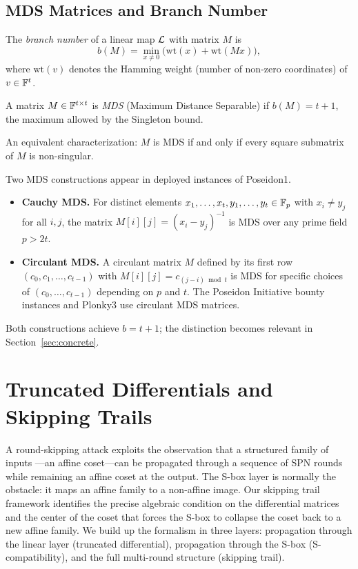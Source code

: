 \documentclass[11pt]{article}
\begin{document}
\subsection{MDS Matrices and Branch Number}
\label{sec:mds}

\begin{definition}
    The \emph{branch number} of a linear map $\mathcal{L}$ with matrix $M$ is
    \[
        b(M) = \min_{x \neq 0}\bigl(\mathrm{wt}(x) + \mathrm{wt}(Mx)\bigr),
    \]
    where $\mathrm{wt}(v)$ denotes the Hamming weight (number of non-zero coordinates) of $v \in \mathbb{F}^t$.
\end{definition}

\begin{definition}
    A matrix $M \in \mathbb{F}^{t \times t}$ is \emph{MDS} (Maximum Distance Separable) if $b(M) = t + 1$, the maximum allowed by the Singleton bound.
\end{definition}

An equivalent characterization: $M$ is MDS if and only if every square submatrix of $M$ is non-singular.

Two MDS constructions appear in deployed instances of Poseidon1.
\begin{itemize}
    \item \textbf{Cauchy MDS.} For distinct elements $x_1,\ldots,x_t,y_1,\ldots,y_t \in \mathbb{F}_p$ with $x_i \neq y_j$ for all $i,j$, the matrix $M[i][j] = (x_i - y_j)^{-1}$ is MDS over any prime field $p > 2t$.
    \item \textbf{Circulant MDS.} A circulant matrix $M$ defined by its first row $(c_0, c_1, \ldots, c_{t-1})$ with $M[i][j] = c_{(j-i) \bmod t}$ is MDS for specific choices of $(c_0,\ldots,c_{t-1})$ depending on $p$ and $t$. The Poseidon Initiative bounty instances and Plonky3 use circulant MDS matrices.
\end{itemize}
Both constructions achieve $b = t + 1$; the distinction becomes relevant in Section~\ref{sec:concrete}.


\section{Truncated Differentials and Skipping Trails}
\label{sec:trails}

A round-skipping attack exploits the observation that a structured family of inputs
---an affine coset---can be propagated through a sequence of SPN rounds while
remaining an affine coset at the output.  The S-box layer is normally the obstacle:
it maps an affine family to a non-affine image.  Our skipping trail framework
identifies the precise algebraic condition on the differential matrices and the
center of the coset that forces the S-box to collapse the coset back to a new affine
family.  We build up the formalism in three layers: propagation through the linear
layer (truncated differential), propagation through the S-box (S-compatibility),
and the full multi-round structure (skipping trail).
\end{document}
